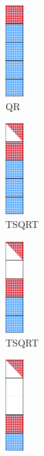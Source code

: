   \begin{figure}[h!]
    \captionsetup[subfigure]{justification=justified,singlelinecheck=false}
  \begin{subfigure}[t]{0.160 \textwidth}
    \includegraphics[width=0.7cm, height=3.5cm]{fig/SVD_rect_panel_1}
    \caption{\label{fig:geqrt_1}QR}
  \end{subfigure}
  \hfill
  \begin{subfigure}[t]{0.160 \textwidth}
    \includegraphics[width=0.7cm, height=3.5cm]{fig/SVD_rect_panel_3}
    \caption{\label{fig:tsqrt_2}TSQRT}
  \end{subfigure}
  \hfill
    \begin{subfigure}[t]{0.160 \textwidth}
    \includegraphics[width=0.7cm, height=3.5cm]{fig/SVD_rect_panel_5}
    \caption{\label{fig:tsqrt_3} TSQRT}
    \end{subfigure}
    \hfill
    \begin{subfigure}[t]{0.160 \textwidth}
      \includegraphics[width=0.7cm, height=3.5cm]{fig/SVD_rect_panel_6}

\end{subfigure}
\end{figure}
